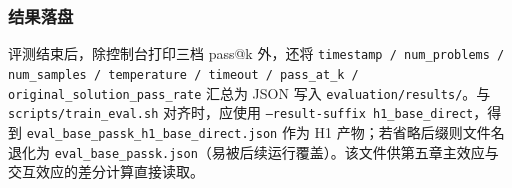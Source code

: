 \subsubsection{结果落盘}
评测结束后，除控制台打印三档 pass@k 外，还将 \texttt{timestamp / num\_problems / num\_samples / temperature / timeout / pass\_at\_k / original\_solution\_pass\_rate} 汇总为 JSON 写入 \texttt{evaluation/results/}。与 \texttt{scripts/train\_eval.sh} 对齐时，应使用 \texttt{--result-suffix h1\_base\_direct}，得到 \texttt{eval\_base\_passk\_h1\_base\_direct.json} 作为 H1 产物；若省略后缀则文件名退化为 \texttt{eval\_base\_passk.json}（易被后续运行覆盖）。该文件供第五章主效应与交互效应的差分计算直接读取。